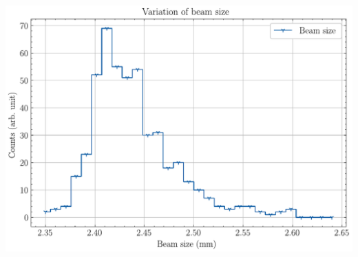 \begin{frame}
\begin{columns}[T]
\begin{column}{0.45\textwidth}
      \includegraphics[width=1\textwidth]{04_Test/fig/fig000_hist_variation_b}
    \end{column}
  \end{columns}
\end{frame}

